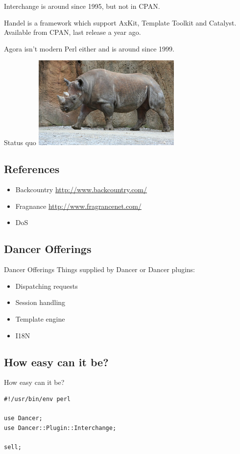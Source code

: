 Interchange is around since 1995, but not in CPAN.

Handel is a framework which support AxKit, Template Toolkit 
and Catalyst.
Available from CPAN, last release a year ago.

Agora isn't modern Perl either and is around since 1999.

\begin{frame}{Status quo}
  \includegraphics{rhino.jpg}
\end{frame}

\subsection{References}
\begin{frame}
\begin{itemize}
\item Backcountry \url{http://www.backcountry.com/}
\item Fragnance \url{http://www.fragrancenet.com/}
\item DoS
\end{itemize}
\end{frame}

\subsection{Dancer Offerings}
\begin{frame}{Dancer Offerings}
Things supplied by Dancer or Dancer plugins:

\begin{itemize}
\item Dispatching requests
\item Session handling
\item Template engine
\item I18N
\end{itemize}
\end{frame}

\subsection{How easy can it be?}
\begin{frame}[fragile]{How easy can it be?}
\begin{lstlisting}
#!/usr/bin/env perl

use Dancer;
use Dancer::Plugin::Interchange;

sell;
\end{lstlisting}
\end{frame}

